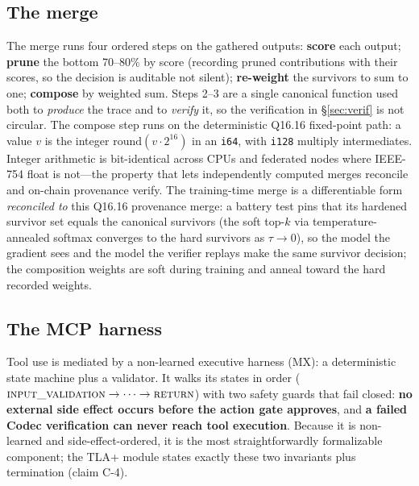 \documentclass[11pt]{article}
\newcommand{\zone}[1]{\textsc{#1}}
\newcommand{\Qff}{Q16.16}
\begin{document}
\subsection{The merge}
The merge runs four ordered steps on the gathered outputs: \textbf{score} each output; \textbf{prune}
the bottom 70--80\% by score (recording pruned contributions with their scores, so the decision is
auditable not silent); \textbf{re-weight} the survivors to sum to one; \textbf{compose} by weighted
sum. Steps 2--3 are a single canonical function used both to \emph{produce} the trace and to
\emph{verify} it, so the verification in \S\ref{sec:verif} is not circular. The compose step runs on
the deterministic \Qff{} fixed-point path: a value $v$ is the integer $\mathrm{round}(v\cdot 2^{16})$
in an \texttt{i64}, with \texttt{i128} multiply intermediates. Integer arithmetic is bit-identical
across CPUs and federated nodes where IEEE-754 float is not---the property that lets independently
computed merges reconcile and on-chain provenance verify. The training-time merge is a differentiable
form \emph{reconciled to} this \Qff{} provenance merge: a battery test pins that its hardened survivor
set equals the canonical survivors (the soft top-$k$ via temperature-annealed softmax converges to
the hard survivors as $\tau\to 0$), so the model the gradient sees and the model the verifier replays
make the same survivor decision; the composition weights are soft during training and anneal toward
the hard recorded weights.

\subsection{The MCP harness}
Tool use is mediated by a non-learned executive harness (\zone{MX}): a deterministic state machine plus
a validator. It walks its states in order ($\textsc{input\_validation}\to\cdots\to\textsc{return}$)
with two safety guards that fail closed: \textbf{no external side effect occurs before the action gate
approves}, and \textbf{a failed Codec verification can never reach tool execution}. Because it is
non-learned and side-effect-ordered, it is the most straightforwardly formalizable component; the
TLA+ module states exactly these two invariants plus termination (claim C-4).
\end{document}
